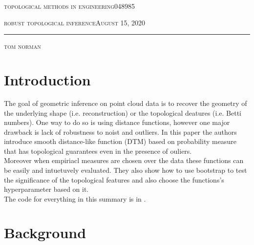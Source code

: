 \documentclass[11pt]{article}
\theoremstyle{definition}
\theoremstyle{definition}
\def \lecturedate {August 15, 2020}
\begin{document}
\noindent
\begin{minipage}[t]{1\columnwidth}%
\textsc{topological methods in engineering}\hspace*{\fill}048985
\vspace{2mm}

\textsc{\LARGE robust topological inference}\hspace*{\fill}\textsc{\lecturedate}

\noindent \rule[0.5ex]{1\linewidth}{1pt}

\textsc{tom norman}
\vspace{10mm}
\end{minipage}



\newcommand {\image}[5] {
    \begin{figure}
        \begin{center}
		\texttt{[image: imgs/\#1]}
		\caption{#2}
		\label{#5}
        \end{center}
    \end{figure}
}


\section{Introduction}
	The goal of geometric inference on point cloud data is to recover the geometry of the underlying shape (i.e. reconstruction) or the topological deatures (i.e. Betti numbers).
	One way to do so is using distance functions, however one major drawback is lack of robustness to noist and outliers.
	In  this paper the authors introduce smooth distance-like function (DTM) based on probability measure that has topological guarantees even in the presence of ouliers.\\
	Moreover when empiriacl measures are chosen over the data these functions can be easily and intuetuvely evaluated.
	They also show how to use bootstrap to test the significance of the topological features and also choose the functions's hyperparameter based on it.\\
	The code for everything in this summary is in \cite{git}.
\section{Background}
\end{document}
